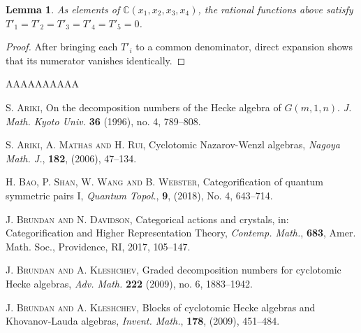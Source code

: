 \documentclass[a4,10pt]{amsart}
\numberwithin{equation}{section}
\newtheorem{Lemma}[Theorem]{Lemma}
\theoremstyle{definition}
\begin{document}
\endgroup
\begin{Lemma}
\label{lem:primed-rational-identities}
As elements of $\mathbb C(x_1,x_2,x_3,x_4)$, the rational functions
above satisfy $
 T'_1=T'_2=T'_3=T'_4=T'_5=0$.
\end{Lemma}

\begin{proof}
After bringing each $T'_i$ to a common denominator, direct expansion
shows that its numerator vanishes identically. 
\end{proof}










\begin{thebibliography}{AAAAAAAAAA}
\setlength{\baselineskip}{14pt}

 {\scshape S. Ariki},
On the decomposition numbers of the Hecke algebra of $G(m,1,n)$.
{\it J. Math. Kyoto Univ.} \textbf{36} (1996), no. 4, 789–808.

 {\scshape S. Ariki, A. Mathas and  H. Rui}, Cyclotomic Nazarov-Wenzl algebras, {\it Nagoya Math. J.}, \textbf{182}, (2006), 47–134.



 {\scshape H. Bao, P. Shan, W. Wang and B. Webster}, Categorification of quantum symmetric pairs {I}, {\it Quantum Topol.}, \textbf{9}, (2018), No. 4, 643--714.



 {\scshape J. Brundan and  N. Davidson}, Categorical actions and crystals, in: Categorification and Higher Representation Theory, {\it Contemp. Math.}, \textbf{683},  Amer. Math. Soc., Providence, RI,  2017, 105--147.

 {\scshape J. Brundan and A.  Kleshchev}, 
{Graded decomposition numbers for cyclotomic Hecke algebras}, {\it Adv. Math. } \textbf{222} (2009), no. 6, 1883–1942.

 {\scshape J. Brundan and  A. Kleshchev}, {Blocks of cyclotomic Hecke algebras and  Khovanov-Lauda algebras}, {\it Invent. Math.}, \textbf{178}, (2009), 451--484.


\end{thebibliography}
\end{document}

